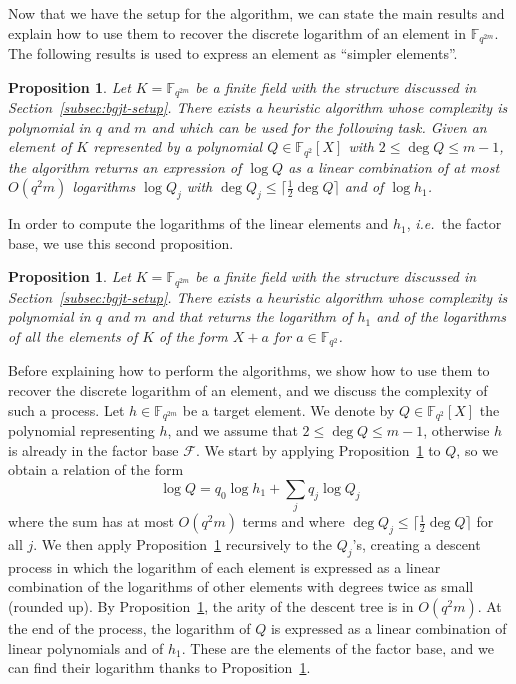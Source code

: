 \documentclass[a4paper,11pt]{article}
\theoremstyle{break}
\newtheorem{prop}[thm]{Proposition}
\theoremstyle{sc}
\theoremstyle{definition}
\theoremstyle{remark}
\newcommand{\ie}{\emph{i.e.\ }}
\begin{document}
Now that we have the setup for the algorithm, we can state the main results and
explain how to use them to recover the discrete logarithm of an element in
$\mathbb{F}_{q^{2m}}$. The following results is used to express an element as
``simpler elements''.

\begin{prop}
  \label{prop:bgjt}
  Let $K = \mathbb{F}_{q^{2m}}$ be a finite field with the structure discussed
  in Section~\ref{subsec:bgjt-setup}.
  There exists a heuristic algorithm whose complexity is polynomial in $q$ and
  $m$ and which can be used for the following task. Given an element of $K$ represented by a polynomial
  $Q\in\mathbb{F}_{q^2}[X]$ with $2\leq \deg Q \leq m-1$, the algorithm
  returns an expression of $\log Q$ as a linear combination of at most
  $O(q^2m)$ logarithms $\log Q_j$ with $\deg Q_j\leq
  \lceil\frac{1}{2}\deg Q\rceil$ and of $\log h_1$.
\end{prop}

In order to compute the logarithms of the linear elements and $h_1$, \ie the
factor base, we use this second proposition.

\begin{prop}
  \label{prop:bgjt2}
  Let $K = \mathbb{F}_{q^{2m}}$ be a finite field with the structure discussed
  in Section~\ref{subsec:bgjt-setup}.
  There exists a heuristic algorithm whose complexity is polynomial in $q$ and
  $m$ and that returns the logarithm of $h_1$ and of the logarithms of
  all the elements of $K$ of the form $X+a$ for $a\in\mathbb{F}_{q^2}$.
\end{prop}

Before explaining how to perform the algorithms,
we show how to use them to recover the discrete logarithm of an element, and we
discuss the complexity of such a process. Let $h\in\mathbb{F}_{q^{2m}}$ be a
target element. We denote by $Q\in\mathbb{F}_{q^2}[X]$ the polynomial
representing $h$, and we assume that $2\leq \deg Q\leq m-1$, otherwise $h$ is
already in the factor base $\mathcal F$. We start by applying
Proposition~\ref{prop:bgjt} to $Q$, so we obtain a relation of the form
\[
  \log Q = q_0\log h_1 + \sum_j q_j\log Q_j
\]
where the sum has at most $O(q^2m)$ terms and where $\deg
Q_j\leq\lceil\frac{1}{2}\deg Q\rceil$ for all $j$. We then apply
Proposition~\ref{prop:bgjt}
recursively to the $Q_j$'s, creating a descent process in which the logarithm of
each element is expressed as a linear combination of the logarithms of other
elements with degrees twice as small (rounded up). By Proposition~\ref{prop:bgjt}, the
arity of the descent tree is in $O(q^2m)$. At the end of the process, the
logarithm of $Q$ is expressed as a linear combination of linear polynomials and
of $h_1$. These are the elements of the factor base, and we can find their
logarithm thanks to Proposition~\ref{prop:bgjt2}.
\end{document}
